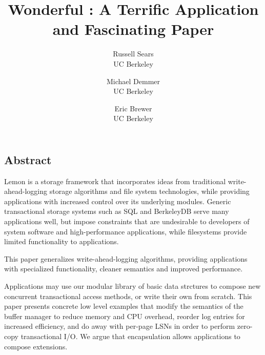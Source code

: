 \documentclass[letterpaper,twocolumn,10pt]{article}
\newcommand{\yad}{Lemon\xspace}
\begin{document}
\date{}


\title{\Large \bf Wonderful : A Terrific Application and Fascinating Paper}

\author{
{\rm Russell Sears}\\
UC Berkeley
\and
{\rm Michael Demmer}\\
UC Berkeley
\and
{\rm Eric Brewer}\\
UC Berkeley
} %

\maketitle

\thispagestyle{empty}


\subsection*{Abstract}


\yad is a storage framework that incorporates ideas from traditional
write-ahead-logging storage algorithms and file system technologies,
while providing applications with increased control over its
underlying modules.  Generic transactional storage systems such as SQL
and BerkeleyDB serve many applications well, but impose constraints
that are undesirable to developers of system software and
high-performance applications, while filesystems provide limited
functionality to applications.

This paper generalizes write-ahead-logging algorithms, providing
applications with specialized functionality, cleaner semantics and
improved performance.

Applications may use our modular library of basic data strctures to
compose new concurrent transactional access methods, or write their
own from scratch.  This paper presents concrete low level examples
that modify the semantics of the buffer manager to reduce memory and
CPU overhead, reorder log entries for increased efficiency, and do
away with per-page LSNs in order to perform zero-copy transactional
I/O.  We argue that encapsulation allows applications to compose
extensions.
\end{document}

